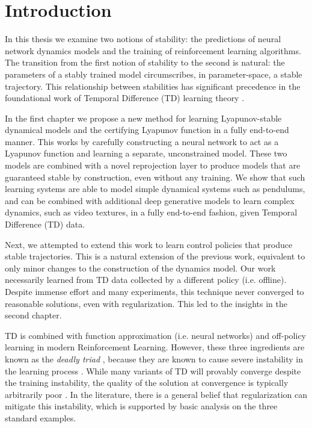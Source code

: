 \documentclass[12pt]{cmuthesis}
\begin{document}
\cleardoublepage

\tableofcontents

\cleardoublepage

\linenumbers

\chapter{Introduction}

In this thesis we examine two notions of stability: the predictions of neural network dynamics models and the training of reinforcement learning algorithms. The transition from the first notion of stability to the second is natural: the parameters of a stably trained model circumscribes, in parameter-space, a stable trajectory.
This relationship between stabilities has significant precedence in the foundational work of Temporal Difference (TD) learning theory \cite{tsitsiklis1996analysis}. %

In the first chapter we propose a new method for learning Lyapunov-stable dynamical models and the certifying Lyapunov function in a fully end-to-end manner.
This works by carefully constructing a neural network to act as a Lyapunov function and learning a separate, unconstrained model. These two models are combined with a novel reprojection layer to produce models that are guaranteed stable by construction, even without any training. We show that such learning systems are able to model simple dynamical systems such as pendulums, and can be combined with additional deep generative models to learn complex dynamics, such as video textures, in a fully end-to-end fashion, given Temporal Difference (TD) data.

Next, we attempted to extend this work to learn control policies that produce stable trajectories. This is a natural extension of the previous work, equivalent to only minor changes to the construction of the dynamics model. Our work necessarily learned from TD data collected by a different policy (i.e. offline). Despite immense effort and many experiments, this technique never converged to reasonable solutions, even with regularization. This led to the insights in the second chapter.

TD is combined with function approximation (i.e. neural networks) and off-policy learning in modern Reinforcement Learning. However, these three ingredients are known as the \emph{deadly triad} \cite[p.~264]{sutton2020reinforcement}, because they are known to cause severe instability in the learning process \citet{tsitsiklis1996analysis}. While many variants of TD will provably converge despite the training instability, the quality of the solution at convergence is typically arbitrarily poor \citep{kolter2011fixed}. In the literature, there is a general belief that regularization can mitigate this instability, which is supported by basic analysis on the three standard examples.
\end{document}
